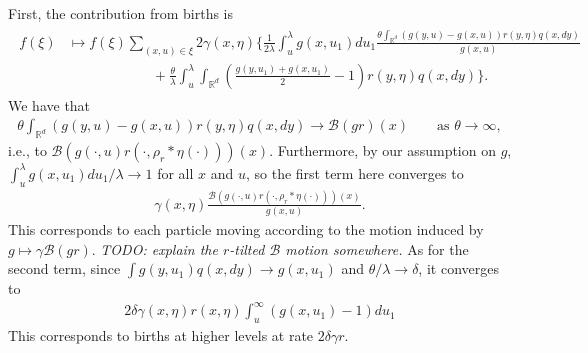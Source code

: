 \documentclass[12pt]{article}
\newcommand{\IR}{\mathbb R}
\newcommand{\DG}{\mathcal{B}}  %
\newcommand{\kernel}{\rho}  %
\newcommand{\smooth}[1]{\kernel_{#1} \! * \!}  %
\newcommand{\lp}{\xi}              %
\newcommand{\comment}[1]{{\color{blue} \it #1}}
\begin{document}
First, the contribution from births is
\begin{align*}
\begin{split}
f(\lp)
&\mapsto
    f(\lp)
    \sum_{(x, u) \in \lp}
    2 \gamma(x, \eta)
    \bigg\{
        \frac{1}{2 \lambda}
        \int_u^\lambda
        g(x, u_1) du_1
        \frac{
            \theta \int_{\IR^d} (g(y, u) - g(x, u)) r(y, \eta) q(x, dy)
        }{
            g(x, u)
        }
    \\ & \qquad \qquad \qquad {}
        + \frac{\theta}{\lambda}
        \int_u^\lambda \int_{\IR^d}
        \left( \frac{g(y, u_1) + g(x, u_1)}{2} - 1 \right)
        r(y, \eta) q(x, dy)
    \bigg\}
    .
    \end{split}
\end{align*}
We have that
\begin{align*}
    \theta \int_{\IR^d} (g(y, u) - g(x, u)) r(y, \eta) q(x, dy)
    \to
    \DG(gr)(x) \qquad \text{as }\theta \to \infty,
\end{align*}
i.e., to $\DG\left(g(\cdot, u) r(\cdot, \smooth{r}\eta(\cdot))\right)(x)$.
Furthermore, by our assumption on $g$,
$\int_u^\lambda g(x, u_1) du_1 / \lambda \to 1$ for all $x$ and $u$,
so the first term here converges to
\begin{align*}
    \gamma(x, \eta)
        \frac{
            \DG\left( g(\cdot, u) r(\cdot, \smooth{r}\eta(\cdot))\right)(x)
        }{
            g(x, u)
        } .
\end{align*}
This corresponds to each particle moving according to the motion induced by
$g \mapsto \gamma \DG(gr)$.
\comment{TODO: explain the $r$-tilted $\DG$ motion somewhere.}
As for the second term,
since $\int g(y, u_1) q(x, dy) \to g(x, u_1)$
and $\theta/\lambda \to \delta$,
it converges to
\begin{align*}
    2 \delta
    \gamma(x, \eta)
    r(x, \eta) 
    \int_u^\infty
    \left( g(x, u_1) - 1 \right)
    du_1
\end{align*}
This corresponds to births at higher levels at rate $2 \delta \gamma r$.
\end{document}
